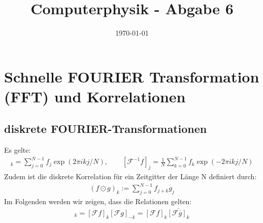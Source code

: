 \documentclass[ngerman]{scrartcl}
\title{Computerphysik - Abgabe 6}
\date{\today}
\begin{document}
	\setcounter{section}{9}
	\thispagestyle{fancy}
	\renewcommand{\thesection}{H.\arabic{section}:}
	\renewcommand{\thesubsection}{H\arabic{section}.\arabic{subsection}}

\section{Schnelle \textsc{FOURIER} Transformation (FFT) und Korrelationen}
\subsection{diskrete FOURIER-Transformationen}
Es gelte: 
\begin{align}
[\mathcal{F}f]_k=\sum \limits_{j=0}^{N-1}f_j \exp(2\pi ikj/N), \qquad [\mathcal{F}^{-1}f]_j=\frac{1}{N}\sum \limits_{k=0}^{N-1}f_k \exp(-2\pi ikj/N)
\end{align}
Zudem ist die diskrete Korrelation für ein Zeitgitter der Länge N definiert durch:
\begin{align}
(f \odot g)_k:=\sum\limits_{j=0}^{N-1}f_{j+k}g_j
\end{align}
Im Folgenden werden wir zeigen, dass die Relationen gelten:
\begin{align}
[\mathcal{F}(f \odot g)]_k=[\mathcal{F}f]_k[\mathcal{F}g]_{-k}=[\mathcal{F}f]_k\overline{[\mathcal{F}\overline{g}]_k}
\end{align}
\end{document}
